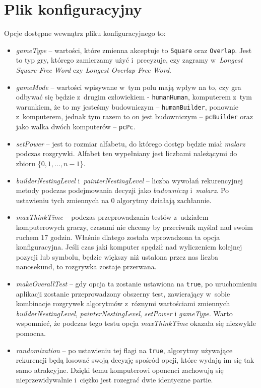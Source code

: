 \documentclass[document]{xmgr}
\begin{document}
\section{Plik konfiguracyjny}
Opcje dostępne wewnątrz pliku konfiguracyjnego to:
\begin{itemize}
\item \emph{gameType} -- wartości, które zmienna akceptuje to \texttt{Square} oraz \mbox{\texttt{Overlap}}. Jest to typ gry, którego zamierzamy użyć i~precyzuje, czy zagramy w~\emph{Longest Square-Free Word} czy \emph{Longest Overlap-Free Word}.
\item \emph{gameMode} -- wartości wpisywane w~tym polu mają wpływ na to, czy gra odbywać się będzie z~drugim człowiekiem - \texttt{humanHuman}, komputerem z~tym warunkiem, że to my jesteśmy budowniczym -- \texttt{humanBuilder}, ponownie z~komputerem, jednak tym razem to on jest budowniczym -- \texttt{pcBuilder} oraz jako walka dwóch komputerów -- \texttt{pcPc}.
\item \emph{setPower} -- jest to rozmiar alfabetu, do którego dostęp będzie miał \emph{malarz} podczas rozgrywki. Alfabet ten wypełniany jest liczbami  należącymi do zbioru $\{0, 1, ...,n-1\}$.
\item \emph{builderNestingLevel} i~\emph{painterNestingLevel} -- liczba wywołań rekurencyjnej metody podczas podejmowania decyzji jako \emph{budowniczy} i~\emph{malarz}. Po ustawieniu tych zmiennych na $0$ algorytmy działają zachłannie. 
\item \emph{maxThinkTime} -- podczas przeprowadzania testów z~udziałem komputerowych graczy, czasami nie chcemy by przeciwnik myślał nad swoim ruchem 17 godzin. Właśnie dlatego została wprowadzona ta opcja konfiguracyjna. Jeśli czas jaki komputer spędził nad wyliczeniem kolejnej pozycji lub symbolu, będzie większy niż ustalona przez nas liczba nanosekund, to rozgrywka zostaje przerwana.
\item \emph{makeOverallTest} -- gdy opcja ta zostanie ustawiona na \texttt{true}, po uruchomieniu aplikacji zostanie przeprowadzony obszerny test, zawierający w~sobie kombinacje rozgrywek algorytmów z~róznymi wartościami zmiennych \emph{builderNestingLevel}, \emph{painterNestingLevel}, \emph{setPower} i \emph{gameType}. Warto wspomnieć, że podczas tego testu opcja \emph{max\-ThinkTime} okazała się niezwykle pomocna.
\item \emph{randomization} -- po ustawieniu tej flagi na \texttt{true}, algorytmy używające rekurencji będą losować swoją decyzję spośród opcji, które wydają im się tak samo atrakcyjne. Dzięki temu komputerowi oponenci zachowują się nieprzewidywalnie i~ciężko jest rozegrać dwie identyczne partie.
\end{itemize}
\newpage
\end{document}
